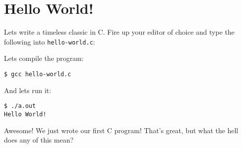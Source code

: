 %

\chapter{Hello World!}

Lets write a timeless classic in C.  Fire up your editor of choice and
type the following into \texttt{hello-world.c}:


\noindent
Lets compile the program:
\begin{verbatim}
$ gcc hello-world.c
\end{verbatim}
And lets run it:
\begin{verbatim}
$ ./a.out
Hello World!
\end{verbatim}
Awesome!  We just wrote our first C program!  That’s great, but what the
hell does any of this mean?
